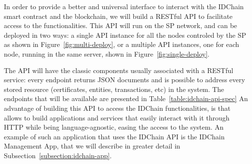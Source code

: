 In order to provide a better and universal interface to interact with the IDChain smart contract and the blockchain, we will build a RESTful \ac{API} to facilitate access to the functionalities.
This \ac{API} will run on the \ac{SP} network, and can be deployed in two ways: a single API instance for all the nodes controled by the \ac{SP} as shown in Figure~\ref{fig:multi-deploy}, or a multiple API instances, one for each node, running in the same server, shown in Figure~\ref{fig:single-deploy}.

\begin{figure}
  \centering
  \caption{}
\end{figure}

The \ac{API} will have the classic components usually associated with a RESTful service: every endpoint returns JSON documents and is possible to address every stored resource (certificates, entities, transactions, etc) in the system.
The endpoints that will be available are presented in Table~\ref{table:idchain-api-spec}
An advantage of building this \ac{API} to access the IDChain functionalities, is that allows to build applications and services that easily interact with it through \ac{HTTP} while being language-agnostic, easing the access to the system.
An example of such an application that uses the IDChain API is the IDChain Management App, that we will describe in greater detail in Subsection~\ref{subsection:idchain-app}.

